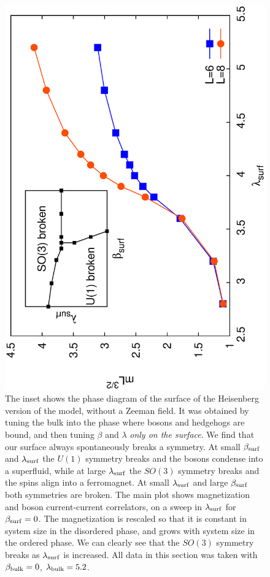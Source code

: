 \documentclass[prb,twocolumn]{revtex4-1}
\begin{document}
\begin{figure}
\includegraphics[angle=-90,width=0.9\linewidth]{figures/heissurf.eps}
\caption{The inset shows the phase diagram of the surface of the Heisenberg version of the model, without a Zeeman field. It was obtained by tuning the bulk into the phase where bosons and hedgehogs are bound, and then tuning $\beta$ and $\lambda$ {\em only on the surface}.  We find that our surface always spontaneously breaks  a symmetry. At small $\beta_{\rm surf}$ and $\lambda_{\rm surf}$ the $U(1)$ symmetry breaks and the bosons condense into a superfluid, while at large $\lambda_{\rm surf}$ the $SO(3)$ symmetry breaks and the spins align into a ferromagnet. At small $\lambda_{\rm surf}$ and large $\beta_{\rm surf}$ both symmetries are broken.  The main plot shows magnetization and boson current-current correlators, on a sweep in $\lambda_{\rm surf}$ for $\beta_{\rm surf}=0$. The magnetization is rescaled so that it is constant in system size in the disordered phase, and grows with system size in the ordered phase. We can clearly see that the $SO(3)$ symmetry breaks as $\lambda_{\rm surf}$ is increased. All data in this section was taken with $\beta_{\rm bulk}=0$, $\lambda_{\rm bulk}=5.2$.}
\label{heissurf}
\end{figure}
\end{document}
